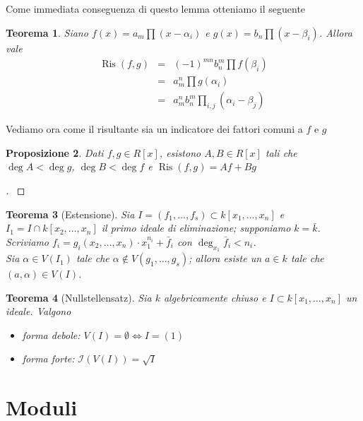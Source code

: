 \documentclass[a4paper,10pt]{article}
\theoremstyle{plain}
\newtheorem{thm}{Teorema}[section]
\newtheorem{prop}[thm]{Proposizione}
\theoremstyle{definition}
\newenvironment{myproof}[1][\proofname]{%
  \begin{proof}[#1]$ $\par\nobreak\ignorespaces
}{%
  \qedhere
  \end{proof}
}
\DeclareMathOperator{\Ris}{Ris}
\begin{document}
Come immediata conseguenza di questo lemma otteniamo il seguente
\begin{thm}
    Siano $f(x)=a_m\prod(x-\alpha_i)$ e $g(x)=b_n\prod(x-\beta_i)$. Allora vale
    $$\begin{array}{lll} \Ris(f,g)&=& \displaystyle(-1)^{mn}b_n^m\prod f(\beta_i)\\
    &=&\displaystyle a_m^n\prod g(\alpha_i) \\
    &=&\displaystyle a_m^nb_n^m\prod_{i,j}(\alpha_i-\beta_j) \end{array}$$
\end{thm}

Vediamo ora come il risultante sia un indicatore dei fattori comuni a $f$ e $g$
\begin{prop}
    Dati $f,g\in R[x]$, esistono $A,B\in R[x]$ tali che $\deg A<\deg g$, $\deg B<\deg f$ e $\Ris(f,g)=Af+Bg$
\end{prop}
\begin{myproof}

\end{myproof}

\begin{thm}[Estensione]
    Sia $I=(f_1,\dots,f_s)\subset k[x_1,\dots,x_n]$ e $I_1=I\cap k[x_2,\dots,x_n]$ il primo ideale di eliminazione; supponiamo $k=\bar k$. Scriviamo $f_i=g_i(x_2,\dots,x_n)\cdot x_1^{n_i}+\bar f_i$ con $\deg_{x_1}\bar f_i<n_i$.\\
    Sia $\alpha\in V(I_1)$ tale che $\alpha\not\in V(g_1,\dots,g_s)$; allora esiste un $a\in k$ tale che $(a,\alpha)\in V(I)$.
\end{thm}

\begin{thm}[Nullstellensatz]
    Sia $k$ algebricamente chiuso e $I\subset k[x_1,\dots,x_n]$ un ideale. Valgono
    \begin{itemize}
        \item forma debole: $V(I)=\emptyset\iff I=(1)$
        \item forma forte: $\mathcal I(V(I))=\sqrt I$
    \end{itemize}
\end{thm}




\section{Moduli}
\end{document}
